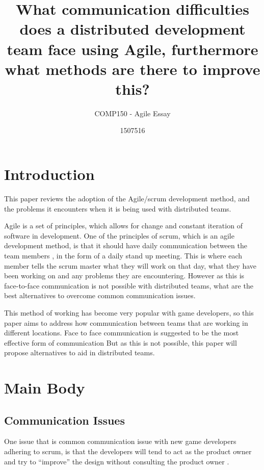 \documentclass{scrartcl}
\title{What communication difficulties does a distributed development team face using Agile, furthermore what methods are there to improve this?}
\subtitle{COMP150 - Agile Essay}
\author{1507516}
\begin{document}
\maketitle


\section{Introduction}

This paper reviews the adoption of the Agile/scrum development method, and the problems it encounters when it is being used with distributed teams.

Agile is a set of principles, which allows for change and constant iteration of software in development. One of the principles of scrum, which is an agile development method, is that it should have daily communication between the team members \cite{abdullah2011}, in the form of a daily stand up meeting. This is where each member tells the scrum master what they will work on that day, what they have been working on and any problems they are encountering. However as this is face-to-face communication is not possible with distributed teams, what are the best alternatives to overcome common communication issues.

This method of working has become very popular with game developers, so this paper aims to address how communication between teams that are working in different locations. 
Face to face communication is suggested to be the most effective form of communication But as this is not possible, this paper will propose alternatives to aid in distributed teams.

\section{Main Body}

\subsection{Communication Issues}

One issue that is common communication issue with new game developers adhering to scrum, is that the developers will tend to act as the product owner and try to ``improve'' the design without consulting the product owner \cite{krasteva2008}. 
\end{document}
